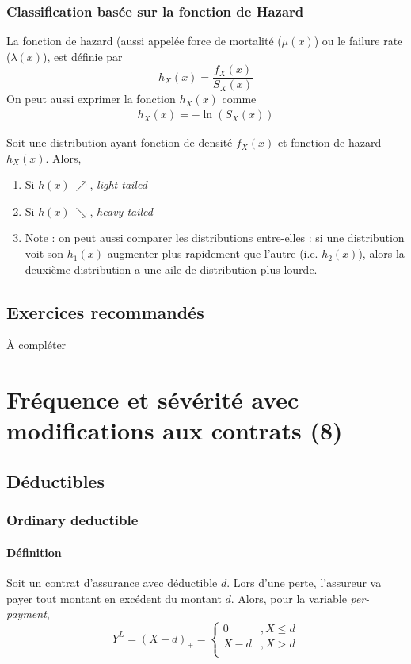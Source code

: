 \documentclass[12pt, french]{report}
\begin{document}
\subsection{Classification basée sur la fonction de Hazard}

\begin{definition}
La fonction de hazard (aussi appelée force de mortalité ($\mu(x)$) ou le failure rate ($\lambda(x)$), est définie par
\begin{equation}
h_X(x) = \frac{f_X(x)}{S_X(x)}
\end{equation}
On peut aussi exprimer la fonction $h_X(x)$ comme
\begin{align*}
h_X(x) = - \ln (S_X(x))
\end{align*}
\end{definition}
Soit une distribution ayant fonction de densité $f_X(x)$ et fonction de hazard $h_X(x)$. Alors,
\begin{enumerate}[label=\faAngleRight]
\item Si $h(x) \ \nearrow$, \textit{light-tailed}
\item Si $h(x) \ \searrow$, \textit{heavy-tailed}
\item Note : on peut aussi comparer les distributions entre-elles : si une distribution voit son $h_1(x)$ augmenter plus rapidement que l'autre (i.e. $h_2(x)$), alors la deuxième distribution a une aile de distribution plus lourde.
\end{enumerate}

\section{Exercices recommandés}
À compléter


\chapter{Fréquence et sévérité avec modifications aux contrats (8)}
\setcounter{section}{1}
\section{Déductibles}
\subsection{Ordinary deductible}
\subsubsection{Définition}
Soit un contrat d'assurance avec déductible $d$. Lors d'une perte, l'assureur va payer tout montant en excédent du montant $d$. Alors, pour la variable \textit{per-payment},
\begin{equation}
Y^L = (X-d)_+ = 
\begin{cases}
0		& , X \leq d \\
X - d	& , X > d \\
\end{cases}
\end{equation}
\end{document}

